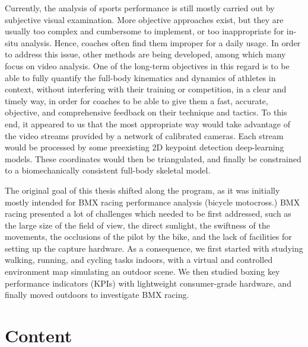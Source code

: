 Currently, the analysis of sports performance is still mostly carried out by subjective visual examination. More objective approaches exist, but they are usually too complex and cumbersome to implement, or too inappropriate for in-situ analysis. Hence, coaches often find them improper for a daily usage. In order to address this issue, other methods are being developed, among which many focus on video analysis. One of the long-term objectives in this regard is to be able to fully quantify the full-body kinematics and dynamics of athletes in context, without interfering with their training or competition, in a clear and timely way, in order for coaches to be able to give them a fast, accurate, objective, and comprehensive feedback on their technique and tactics. To this end, it appeared to us that the most appropriate way would take advantage of the video streams provided by a network of calibrated cameras. Each stream would be processed by some preexisting 2D keypoint detection deep-learning models. These coordinates would then be triangulated, and finally be constrained to a biomechanically consistent full-body skeletal model. 

The original goal of this thesis shifted along the program, as it was initially mostly intended for BMX racing performance analysis (bicycle motocross.) BMX racing presented a lot of challenges which needed to be first addressed, such as the large size of the field of view, the direct sunlight, the swiftness of the movements, the occlusions of the pilot by the bike, and the lack of facilities for setting up the capture hardware. As a consequence, we first started with studying walking, running, and cycling tasks indoors, with a virtual and controlled environment map simulating an outdoor scene. We then studied boxing key performance indicators (KPIs) with lightweight consumer-grade hardware, and finally moved outdoors to investigate BMX racing.


\newpage
\section*{Content}

